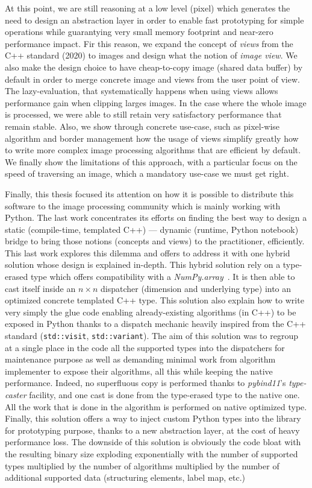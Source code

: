 At this point, we are still reasoning at a low level (pixel) which generates the need to design an abstraction layer in
order to enable fast prototyping for simple operations while guarantying very small memory footprint and near-zero
performance impact. Fir this reason, we expand the concept of \emph{views} from the C++ standard (2020) to images and
design what the notion of \emph{image view}. We also make the design choice to have cheap-to-copy image (shared data
buffer) by default in order to merge concrete image and views from the user point of view. The lazy-evaluation, that
systematically happens when using views allows performance gain when clipping larges images. In the case where the whole
image is processed, we were able to still retain very satisfactory performance that remain stable. Also, we show through
concrete use-case, such as pixel-wise algorithm and border management how the usage of views simplify greatly how to
write more complex image processing algorithms that are efficient by default. We finally show the limitations of this
approach, with a particular focus on the speed of traversing an image, which a mandatory use-case we must get right.

Finally, this thesis focused its attention on how it is possible to distribute this software to the image processing
community which is mainly working with Python. The last work concentrates its efforts on finding the best way to design
a static (compile-time, templated C++) --- dynamic (runtime, Python notebook) bridge to bring those notions (concepts
and views) to the practitioner, efficiently. This last work explores this dilemma and offers to address it with one
hybrid solution whose design is explained in-depth. This hybrid solution rely on a type-erased type which offers
compatibility with a \emph{NumPy.array}~\parencite{harris.2020.numpy}. It is then able to cast itself inside an \(n
\times n\) dispatcher (dimension and underlying type) into an optimized concrete templated C++ type. This solution also
explain how to write very simply the glue code enabling already-existing algorithms (in C++) to be exposed in Python
thanks to a dispatch mechanic heavily inspired from the C++ standard (\texttt{std::visit}, \texttt{std::variant}). The
aim of this solution was to regroup at a single place in the code all the supported types into the dispatchers for
maintenance purpose as well as demanding minimal work from algorithm implementer to expose their algorithms, all this
while keeping the native performance. Indeed, no superfluous copy is performed thanks to \emph{pybind11}'s
\emph{type-caster} facility, and one cast is done from the type-erased type to the native one. All the work that is done
in the algorithm is performed on native optimized type. Finally, this solution offers a way to inject custom Python
types into the library for prototyping purpose, thanks to a new abstraction layer, at the cost of heavy performance
loss. The downside of this solution is obviously the code bloat with the resulting binary size exploding exponentially
with the number of supported types multiplied by the number of algorithms multiplied by the number of additional
supported data (structuring elements, label map, etc.)

